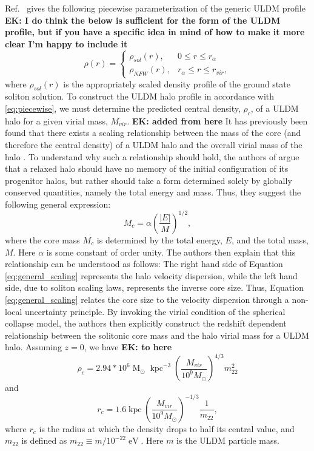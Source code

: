 \documentclass[a4paper,11pt]{article}
\newcommand{\ek}[1]{{{\bf \color{red} EK: #1}}}
\begin{document}
Ref.~\cite{Robles:2018fur} gives the following piecewise parameterization of the generic ULDM profile \ek{I do think the below is sufficient for the form of the ULDM profile, but if you have a specific idea in mind of how to make it more clear I'm happy to include it}
%
\begin{equation}\label{eq:piecewise}
     \rho(r)=
    \begin{cases}
      \rho_{sol}(r), & 0\leq r \leq r_{\alpha} \\
      \rho_{NFW}(r), & r_{\alpha}\leq r \leq r_{vir},
    \end{cases}
\end{equation}
%
where $\rho_{sol}(r)$ is the appropriately scaled density profile of the ground state soliton solution. 
To construct the ULDM halo profile in accordance with \ref{eq:piecewise}, we must determine the predicted central density, $\rho_c$, of a ULDM halo for a given virial mass, $M_{vir}$. \ek{added from here} It has previously been found that there exists a scaling relationship between the mass of the core (and therefore the central density) of a ULDM halo and the overall virial mass of the halo \cite{Schive:2014hza}. To understand why such a relationship should hold, the authors of \cite{Schive:2014hza} argue that a relaxed halo should have no memory of the initial configuration of its progenitor halos, but rather should take a form determined solely by globally conserved quantities, namely the total energy and mass. Thus, they suggest the following general expression:
\begin{equation}\label{eq:general_scaling}
    M_c = \alpha \left(\frac{\vert E\vert}{M}\right)^{1/2},
\end{equation}
where the core mass $M_c$ is determined by the total energy, $E$, and the total mass, $M$. Here $\alpha$ is some constant of order unity. The authors then explain that this relationship can be understood as follows: The right hand side of Equation \ref{eq:general_scaling} represents the halo velocity dispersion, while the left hand side, due to soliton scaling laws, represents the inverse core size. Thus, Equation \ref{eq:general_scaling} relates the core size to the velocity dispersion through a non-local uncertainty principle. By invoking the virial condition of the spherical collapse model, the authors then explicitly construct the redshift dependent relationship between the solitonic core mass and the halo virial mass for a ULDM halo. Assuming $z = 0$, we have \ek{to here}
\begin{equation}\label{eq:central_dens}
    \rho_c = 2.94*10^6 \operatorname{M}_{\odot}\operatorname{kpc}^{-3}\left(\frac{M_{vir}}{10^9 M_{\odot}}\right)^{4/3}m_{22}^{2}
\end{equation}
and 
\begin{equation}
    r_c = 1.6 \operatorname{kpc}\left(\frac{M_{vir}}{10^9 M_{\odot}}\right)^{-1/3}\frac{1}{m_{22}},
\end{equation}
where $r_c$ is the radius at which the density drops to half its central value, and $m_{22}$ is defined as $m_{22} \equiv m / 10^{-22} \operatorname{eV}$. Here $m$ is the ULDM particle mass. 
\end{document}

